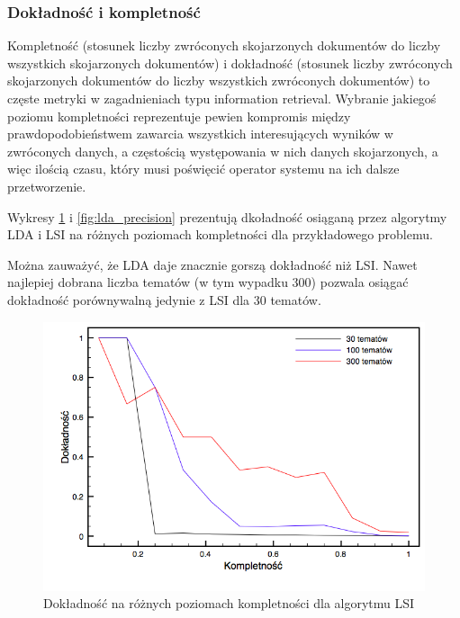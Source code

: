 \documentclass[11pt,a4paper]{article}
\begin{document}
\FloatBarrier

\subsubsection{Dokładność i kompletność}

Kompletność (stosunek liczby zwróconych skojarzonych dokumentów do liczby
wszystkich skojarzonych dokumentów) i dokładność (stosunek liczby zwróconych
skojarzonych dokumentów do liczby wszystkich zwróconych dokumentów) to częste
metryki w zagadnieniach typu information retrieval. Wybranie jakiegoś poziomu
kompletności reprezentuje pewien kompromis między prawdopodobieństwem zawarcia
wszystkich interesujących wyników w zwróconych danych, a częstością
występowania w nich danych skojarzonych, a więc ilością czasu, który musi
poświęcić operator systemu na ich dalsze przetworzenie.

Wykresy \ref{fig:lsi_precision} i \ref{fig:lda_precision} prezentują dkoładność
osiąganą przez algorytmy LDA i LSI na różnych poziomach kompletności dla
przykładowego problemu.

Można zauważyć, że LDA daje znacznie gorszą dokładność niż LSI. Nawet najlepiej
dobrana liczba tematów (w tym wypadku 300) pozwala osiągać dokładność
porównywalną jedynie z LSI dla 30 tematów.

\begin{figure}[h]
\includegraphics[width=\linewidth]{gfx/lsi_precision.png}
\caption{Dokładność na różnych poziomach kompletności dla algorytmu LSI}
\label{fig:lsi_precision}
\end{figure}
\end{document}
